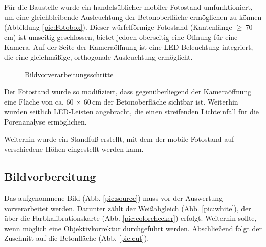\documentclass{article}
\begin{document}
Für die Baustelle wurde ein handelsüblicher mobiler Fotostand umfunktioniert, um eine gleichbleibende Ausleuchtung der Betonoberfläche ermöglichen zu können (Abbildung \ref{pic:Fotobox}). Dieser würfelförmige Fotostand (Kantenlänge $\geq$\,70\,cm) ist umseitig geschlossen, bietet jedoch oberseitig eine Öffnung für eine Kamera. Auf der Seite der Kameraöffnung ist eine LED-Beleuchtung integriert, die eine gleichmäßige, orthogonale Ausleuchtung ermöglicht.

\begin{figure}[htbp]
	\centering
	\caption{Bildvorverarbeitungsschritte}
\end{figure}

Der Fotostand wurde so modifiziert, dass gegenüberliegend der Kameraöffnung eine Fläche von ca. 60 $\times$ 60\,cm der Betonoberfläche sichtbar ist. Weiterhin wurden seitlich LED-Leisten angebracht, die einen streifenden Lichteinfall für die Porenanalyse ermöglichen.

Weiterhin wurde ein Standfuß erstellt, mit dem der mobile Fotostand auf verschiedene Höhen eingestellt werden kann.

\subsection{Bildvorbereitung}

Das aufgenommene Bild (Abb. \ref{pic:source}) muss vor der Auswertung vorverarbeitet werden. Darunter zählt der Weißabgleich (Abb. \ref{pic:white}), der über die Farbkalibrationskarte (Abb. \ref{pic:colorchecker}) erfolgt. Weiterhin sollte, wenn möglich eine Objektivkorrektur durchgeführt werden. Abschließend folgt der Zuschnitt auf die Betonfläche (Abb. \ref{pic:cut}).
\end{document}
